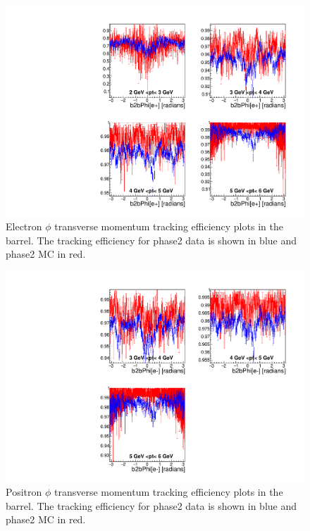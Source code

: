 \documentclass[a4paper,11pt,twosided,final,german,openbib,pdftex,listof=totoc,bibliography=totoc]{scrbook}
\begin{document}
\begin{figure}[!htbp]
	\centering
	\includegraphics[width=\textwidth]{Plots/master/xPtMPhiemBarrel}
	\caption[Transverse Momentum $\phi$ Electron Barrel Efficiency Phase2]{Electron $\phi$ transverse momentum tracking efficiency plots in the barrel. The tracking efficiency for phase2 data is shown in blue and phase2 MC in red.
	\label{plt:xPtMPhiemBarrel}	}
\end{figure}




\begin{figure}[!htbp]
	\centering
	\includegraphics[width=\textwidth]{Plots/master/xPtMPhiepBarrel}
	\caption[Transverse Momentum $\phi$ Positron Barrel Efficiency Phase2]{Positron $\phi$ transverse momentum tracking efficiency plots in the barrel. The tracking efficiency for phase2 data is shown in blue and phase2 MC in red.
		\label{plt:xPtMPhiepBarrel}	}
\end{figure}
\end{document}
